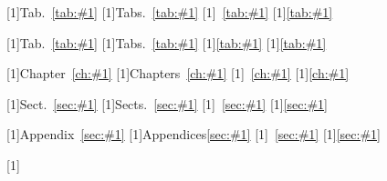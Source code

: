 [1]{Tab.~\ref{tab:#1}}
[1]{Tabs.~\ref{tab:#1}}
[1]{~\ref{tab:#1}}
[1]{\ref{tab:#1}}

[1]{Tab.~\ref{tab:#1}}
[1]{Tabs.~\ref{tab:#1}}
[1]{\ref{tab:#1}}
[1]{\ref{tab:#1}}



[1]{Chapter~\ref{ch:#1}}
[1]{Chapters~\ref{ch:#1}}
[1]{~\ref{ch:#1}}
[1]{\ref{ch:#1}}

[1]{Sect.~\ref{sec:#1}}
[1]{Sects.~\ref{sec:#1}}
[1]{~\ref{sec:#1}}
[1]{\ref{sec:#1}}



[1]{Appendix~\ref{sec:#1}}
[1]{Appendices\ref{sec:#1}}
[1]{~\ref{sec:#1}}
[1]{\ref{sec:#1}}

\nc{\labsec}[1]{\label{sec:#1}}
